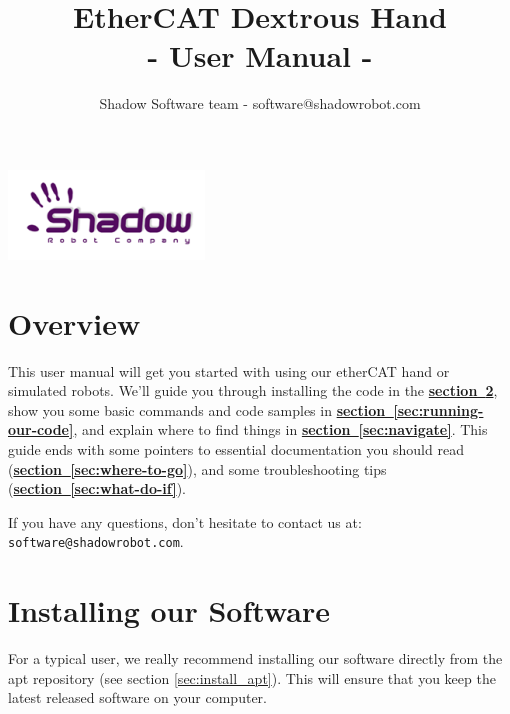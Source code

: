 \documentclass[12pt]{article}
\title{\textbf{EtherCAT Dextrous Hand} \\
- User Manual -}
\author{Shadow Software team - software@shadowrobot.com}
\begin{document}
\begin{titlepage}

\maketitle
\vspace{5cm}
\begin{center}
\includegraphics{images/logo-shadowDB.png}
\end{center}
\end{titlepage}

\tableofcontents
\newpage

\section{Overview}
\label{sec:overview}

\par This user manual will get you started with using our etherCAT hand or simulated robots. We'll guide you through installing the code in the \hyperref[sec:install]{\textbf{section~\ref*{sec:install}}}, show you some basic commands and code samples in \hyperref[sec:running-our-code]{\textbf{section~\ref*{sec:running-our-code}}}, and explain where to find things in \hyperref[sec:navigate]{\textbf{section~\ref*{sec:navigate}}}. This guide ends with some pointers to essential documentation you should read (\hyperref[sec:where-to-go]{\textbf{section~\ref*{sec:where-to-go}}}), and some troubleshooting tips (\hyperref[sec:what-do-if]{\textbf{section~\ref*{sec:what-do-if}}}).

\par If you have any questions, don't hesitate to contact us at: \texttt{software@shadowrobot.com}.

\newpage

\section{Installing our Software}
\label{sec:install}
\par For a typical user, we really recommend installing our software directly from the apt repository (see section \ref{sec:install_apt}). This will ensure that you keep the latest released software on your computer.
\end{document}
